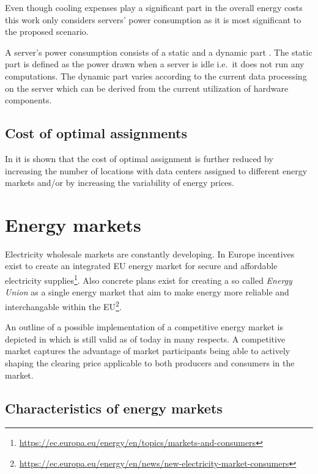 Even though cooling expenses play a significant part in the overall energy costs this work only considers servers' power consumption as it is most significant to the proposed scenario. 

A server's power consumption consists of a static and a dynamic part \cite{liu2013performance}. The static part is defined as the power drawn when a server is idle i.e.~it does not run any computations. The dynamic part varies according to the current data processing on the server which can be derived from the current utilization of hardware components. 


\subsection{Cost of optimal assignments}


In \cite{de2013study} it is shown that the cost of optimal assignment is further reduced by increasing the number of locations with data centers assigned to different energy markets and/or by increasing the variability of energy prices. 





\section{Energy markets}


Electricity wholesale markets are constantly developing. In Europe incentives exist to create an integrated EU energy market for secure and affordable electricity supplies\footnote{\url{https://ec.europa.eu/energy/en/topics/markets-and-consumers}}. Also concrete plans exist for creating a so called \emph{Energy Union} as a single energy market that aim to make energy more reliable and interchangable within the EU\footnote{\url{https://ec.europa.eu/energy/en/news/new-electricity-market-consumers}}. 

An outline of a possible implementation of a competitive energy market is depicted in \cite{hogan1993competitive} which is still valid as of today in many respects. A competitive market captures the advantage of market participants being able to actively shaping the clearing price applicable to both producers and consumers in the market. 




\subsection{Characteristics of energy markets}

